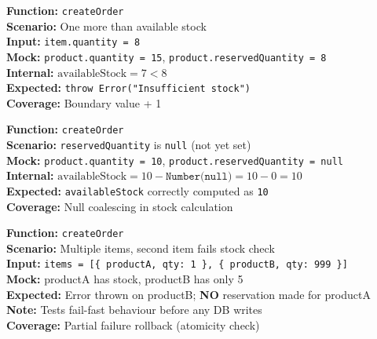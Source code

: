 \documentclass[12pt,a4paper]{report}
\newcommand{\pone}{\textbf{\color{p1red}P1}}
\newcommand{\ptwo}{\textbf{\color{p2orange}P2}}
\begin{document}
\begin{tcolorbox}[criticalbox, title={ORD-006 \hfill \pone\ --- Boundary + 1}]
\textbf{Function:} \texttt{createOrder} \\
\textbf{Scenario:} One more than available stock \\
\textbf{Input:} \texttt{item.quantity = 8} \\
\textbf{Mock:} \texttt{product.quantity = 15}, \texttt{product.reservedQuantity = 8} \\
\textbf{Internal:} $\text{availableStock} = 7 < 8$ \\
\textbf{Expected:} \texttt{throw Error("Insufficient stock")} \\
\textbf{Coverage:} Boundary value + 1
\end{tcolorbox}

\begin{tcolorbox}[testbox, title={ORD-007 \hfill \ptwo}]
\textbf{Function:} \texttt{createOrder} \\
\textbf{Scenario:} \texttt{reservedQuantity} is \texttt{null} (not yet set) \\
\textbf{Mock:} \texttt{product.quantity = 10}, \texttt{product.reservedQuantity = null} \\
\textbf{Internal:} $\text{availableStock} = 10 - \texttt{Number(null)} = 10 - 0 = 10$ \\
\textbf{Expected:} \texttt{availableStock} correctly computed as \texttt{10} \\
\textbf{Coverage:} Null coalescing in stock calculation
\end{tcolorbox}

\begin{tcolorbox}[criticalbox, title={ORD-008 \hfill \pone\ --- Atomicity Gap}]
\textbf{Function:} \texttt{createOrder} \\
\textbf{Scenario:} Multiple items, second item fails stock check \\
\textbf{Input:} \texttt{items = [\{ productA, qty: 1 \}, \{ productB, qty: 999 \}]} \\
\textbf{Mock:} productA has stock, productB has only 5 \\
\textbf{Expected:} Error thrown on productB; \textbf{NO} reservation made for productA \\
\textbf{Note:} Tests fail-fast behaviour before any DB writes \\
\textbf{Coverage:} Partial failure rollback (atomicity check)
\end{tcolorbox}
\end{document}
